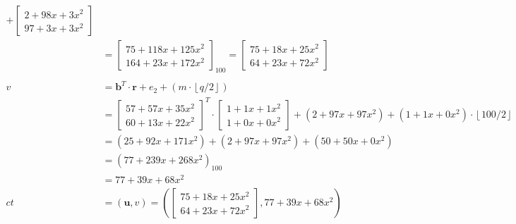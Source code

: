 \begin{align*}
  +
  \begin{bmatrix}2+98x+3x^2 \\ 97+3x+3x^2 \end{bmatrix}                                                      \\
               & = \begin{bmatrix}75+118x+125x^2 \\ 164+23x+172x^2 \end{bmatrix}_{100}
  = 
  \begin{bmatrix}75+18x+25x^2 \\ 64+23x+72x^2 \end{bmatrix}                                                  \\
  \\
  v            & = \textbf{b}^T \cdot \textbf{r} + e_2 + (m\cdot\left\lfloor q/2\right\rfloor)                        \\
               & =\begin{bmatrix}
                    57+57x+35x^2 \\
                    60+13x+22x^2
                  \end{bmatrix} ^T
  \cdot
  \begin{bmatrix}1+1x+1x^2 \\ 1+0x+0x^2 \end{bmatrix}
  + (2+97x+97x^2) + (1+1x+0x^2) \cdot \left\lfloor 100/2\right\rfloor                                       \\
               & = (25+92x+171x^2) + (2+97x+97x^2) + (50+50x+0x^2)                                          \\
               & = (77+239x+268x^2)_{100}                                                                    \\
               & = 77+39x+68x^2                                                                              \\
  ct           & = (\textbf{u}, v) = \left (
  \begin{bmatrix}75+18x+25x^2 \\ 64+23x+72x^2 \end{bmatrix}, 77+39x+68x^2   \right )                         \\
\end{align*}

